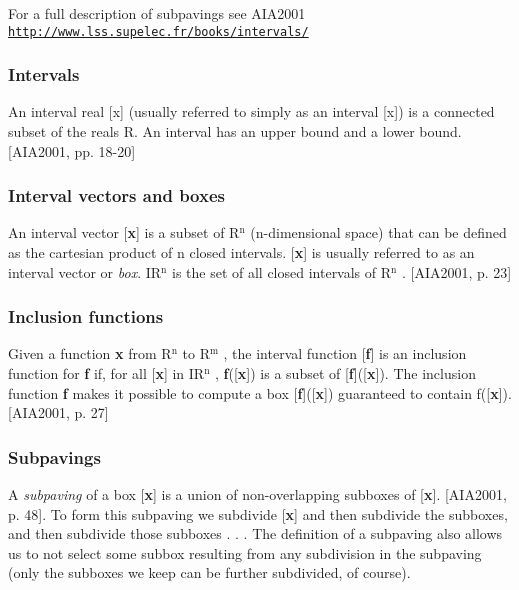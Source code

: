 \-For a full description of subpavings see \-A\-I\-A2001 \href{http://www.lss.supelec.fr/books/intervals/}{\tt http\-://www.\-lss.\-supelec.\-fr/books/intervals/}\hypertarget{pavproc_intervals}{}\subsubsection{\-Intervals}\label{pavproc_intervals}
\-An interval real \mbox{[}x\mbox{]} (usually referred to simply as an interval \mbox{[}x\mbox{]}) is a connected subset of the reals \-R. \-An interval has an upper bound and a lower bound. \mbox{[}\-A\-I\-A2001, pp. 18-\/20\mbox{]}\hypertarget{pavproc_intervalvectors}{}\subsubsection{\-Interval vectors and boxes}\label{pavproc_intervalvectors}
\-An interval vector \mbox{[}{\bfseries x}\mbox{]} is a subset of \-R$^{\mbox{n}}$  (n-\/dimensional space) that can be defined as the cartesian product of n closed intervals. \mbox{[}{\bfseries x}\mbox{]} is usually referred to as an interval vector or {\itshape box\/}. \-I\-R$^{\mbox{n}}$  is the set of all closed intervals of \-R$^{\mbox{n}}$ . \mbox{[}\-A\-I\-A2001, p. 23\mbox{]}\hypertarget{pavproc_inclfuncs}{}\subsubsection{\-Inclusion functions}\label{pavproc_inclfuncs}
\-Given a function {\bfseries x} from \-R$^{\mbox{n}}$  to \-R$^{\mbox{m}}$ , the interval function \mbox{[}{\bfseries f}\mbox{]} is an inclusion function for {\bfseries f} if, for all \mbox{[}{\bfseries x}\mbox{]} in \-I\-R$^{\mbox{n}}$ , {\bfseries f}(\mbox{[}{\bfseries x}\mbox{]}) is a subset of \mbox{[}{\bfseries f}\mbox{]}(\mbox{[}{\bfseries x}\mbox{]}). \-The inclusion function {\bfseries f} makes it possible to compute a box \mbox{[}{\bfseries f}\mbox{]}(\mbox{[}{\bfseries x}\mbox{]}) guaranteed to contain f(\mbox{[}{\bfseries x}\mbox{]}). \mbox{[}\-A\-I\-A2001, p. 27\mbox{]}\hypertarget{pavproc_subpavs}{}\subsubsection{\-Subpavings}\label{pavproc_subpavs}
\-A {\itshape subpaving\/} of a box \mbox{[}{\bfseries x}\mbox{]} is a union of non-\/overlapping subboxes of \mbox{[}{\bfseries x}\mbox{]}. \mbox{[}\-A\-I\-A2001, p. 48\mbox{]}. \-To form this subpaving we subdivide \mbox{[}{\bfseries x}\mbox{]} and then subdivide the subboxes, and then subdivide those subboxes . . . \-The definition of a subpaving also allows us to not select some subbox resulting from any subdivision in the subpaving (only the subboxes we keep can be further subdivided, of course).

